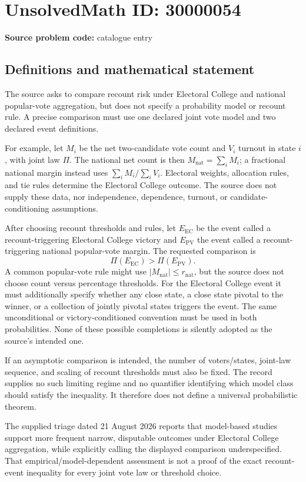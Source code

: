 \documentclass[11pt]{article}
\begin{document}
\section*{UnsolvedMath ID: 30000054}
\textbf{Source problem code:} catalogue entry
\subsection{Definitions and mathematical statement}
The source asks to compare recount risk under Electoral College and national popular-vote aggregation, but does not specify a probability model or recount rule. A precise comparison must use one declared joint vote model and two declared event definitions.

For example, let \(M_i\) be the net two-candidate vote count and \(V_i\) turnout in state \(i\), with joint law \(\Pi\). The national net count is then \(M_{\mathrm{nat}}=\sum_iM_i\); a fractional national margin instead uses \(\sum_iM_i/\sum_iV_i\). Electoral weights, allocation rules, and tie rules determine the Electoral College outcome. The source does not supply these data, nor independence, dependence, turnout, or candidate-conditioning assumptions.

After choosing recount thresholds and rules, let \(E_{\mathrm{EC}}\) be the event called a recount-triggering Electoral College victory and \(E_{\mathrm{PV}}\) the event called a recount-triggering national popular-vote margin. The requested comparison is
\[
 \Pi(E_{\mathrm{EC}})>\Pi(E_{\mathrm{PV}}).
\]
A common popular-vote rule might use \(|M_{\mathrm{nat}}|\leq r_{\mathrm{nat}}\), but the source does not choose count versus percentage thresholds. For the Electoral College event it must additionally specify whether any close state, a close state pivotal to the winner, or a collection of jointly pivotal states triggers the event. The same unconditional or victory-conditioned convention must be used in both probabilities. None of these possible completions is silently adopted as the source's intended one.

If an asymptotic comparison is intended, the number of voters/states, joint-law sequence, and scaling of recount thresholds must also be fixed. The record supplies no such limiting regime and no quantifier identifying which model class should satisfy the inequality. It therefore does not define a universal probabilistic theorem.

The supplied triage dated 21 August 2026 reports that model-based studies support more frequent narrow, disputable outcomes under Electoral College aggregation, while explicitly calling the displayed comparison underspecified. That empirical/model-dependent assessment is not a proof of the exact recount-event inequality for every joint vote law or threshold choice.
\end{document}

